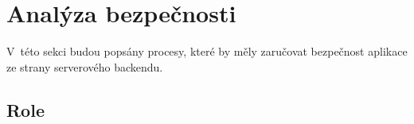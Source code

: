         
            
            
            

\section{Analýza bezpečnosti}
    V~této sekci budou popsány procesy, které by měly zaručovat bezpečnost aplikace ze strany serverového backendu.
    
    \subsection{Role}\label{analyza:bezpecnost:role}
    
